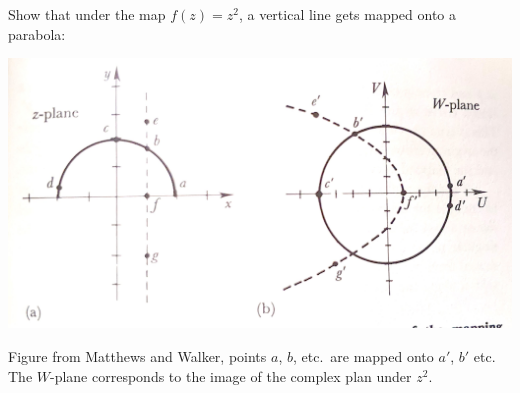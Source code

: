 \begin{exercise}
Show that under the map $f(z)=z^2$, a vertical line gets mapped onto a parabola:
\begin{center}
\includegraphics[width=.7\textwidth]{figures/lec13z2.jpg}
\end{center}
Figure from Matthews and Walker, points $a$, $b$, etc.\ are mapped onto $a'$, $b'$ etc. The $W$-plane corresponds to the image of the complex plan under $z^2$.
\end{exercise}

